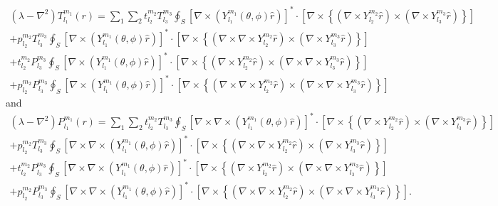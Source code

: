 \begin{multline}
\left(\lambda-\nabla^{2}\right)T_{l_1}^{m_1}\left(r\right)=\sum_{1}\sum_{2}
%
t_{l_2}^{m_2} T_{l_3}^{m_3} \oint_S \left[\nabla \times (Y_{l_1}^{m_1}(\theta,\phi)\hat{r})\right]^* \cdot 
\left[\nabla\times\left\{ \left(\nabla\times Y_{l_2}^{m_2}\hat{r}\right)\times \left(\nabla\times Y_{l_3}^{m_3}\hat{r}\right)   \right\}\right]  \\
+
p_{l_2}^{m_2} T_{l_3}^{m_3} \oint_S  \left[\nabla \times (Y_{l_1}^{m_1}(\theta,\phi)\hat{r})\right]^* \cdot
\left[\nabla\times\left\{ \left(\nabla\times\nabla\times Y_{l_2}^{m_2}\hat{r}\right)\times \left(\nabla\times Y_{l_3}^{m_3}\hat{r}\right)   \right\}\right]\\
+
t_{l_2}^{m_2} P_{l_3}^{m_3} \oint_S  \left[\nabla \times (Y_{l_1}^{m_1}(\theta,\phi)\hat{r})\right]^* \cdot 
\left[\nabla\times\left\{ \left(\nabla\times Y_{l_2}^{m_2}\hat{r}\right)\times \left(\nabla\times\nabla\times Y_{l_3}^{m_3}\hat{r}\right)   \right\}\right]  \\
+
p_{l_2}^{m_2} P_{l_3}^{m_3} \oint_S  \left[\nabla \times (Y_{l_1}^{m_1}(\theta,\phi)\hat{r})\right]^* \cdot
\left[\nabla\times\left\{ \left(\nabla\times\nabla\times Y_{l_2}^{m_2}\hat{r}\right)\times \left(\nabla\times\nabla\times Y_{l_3}^{m_3}\hat{r}\right)   \right\}\right]
\label{eq:bgtorexpand3}
\end{multline}
and 
\begin{multline}
\left(\lambda-\nabla^{2}\right)P_{l_1}^{m_1}\left(r\right)=\sum_{1}\sum_{2}
%
 t_{l_2}^{m_2} T_{l_3}^{m_3} \oint_S\left[\nabla\times \nabla \times (Y_{l_1}^{m_1}(\theta,\phi)\hat{r})\right]^* \cdot 
\left[\nabla\times\left\{ \left(\nabla\times Y_{l_2}^{m_2}\hat{r}\right)\times \left(\nabla\times Y_{l_3}^{m_3}\hat{r}\right)   \right\}\right]  \\
+
p_{l_2}^{m_2} T_{l_3}^{m_3} \oint_S  \left[\nabla\times\nabla \times (Y_{l_1}^{m_1}(\theta,\phi)\hat{r})\right]^* \cdot
\left[\nabla\times\left\{ \left(\nabla\times\nabla\times Y_{l_2}^{m_2}\hat{r}\right)\times \left(\nabla\times Y_{l_3}^{m_3}\hat{r}\right)   \right\}\right]\\
+
t_{l_2}^{m_2} P_{l_3}^{m_3} \oint_S  \left[\nabla\times\nabla \times (Y_{l_1}^{m_1}(\theta,\phi)\hat{r})\right]^* \cdot 
\left[\nabla\times\left\{ \left(\nabla\times Y_{l_2}^{m_2}\hat{r}\right)\times \left(\nabla\times\nabla\times Y_{l_3}^{m_3}\hat{r}\right)   \right\}\right]  \\
+
p_{l_2}^{m_2} P_{l_3}^{m_3} \oint_S \left[\nabla\times\nabla \times (Y_{l_1}^{m_1}(\theta,\phi)\hat{r})\right]^* \cdot
\left[\nabla\times\left\{ \left(\nabla\times\nabla\times Y_{l_2}^{m_2}\hat{r}\right)\times \left(\nabla\times\nabla\times Y_{l_3}^{m_3}\hat{r}\right)   \right\}\right].
\label{eq:bgpolexpand3}
\end{multline}

